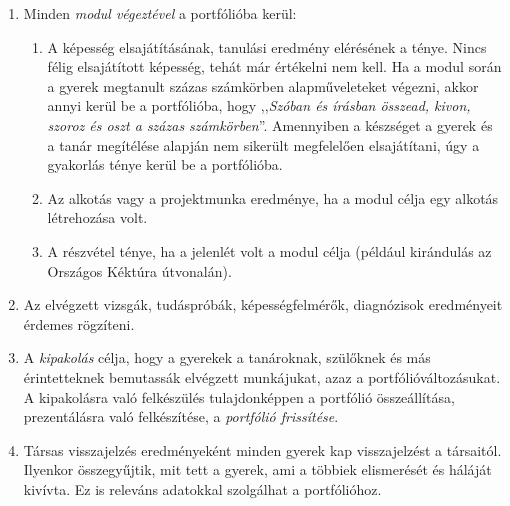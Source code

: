 \begin{enumerate}
      \item Minden \emph{modul végeztével} a portfólióba kerül:

            \begin{enumerate}

                  \item  A képesség elsajátításának, tanulási eredmény
                        elérésének a ténye.
                        Nincs
                        félig elsajátított képesség, tehát már értékelni nem
                        kell. Ha a modul során a gyerek megtanult százas
                        számkörben alapműveleteket
                        végezni, 
                        akkor
                        annyi kerül be a portfólióba, hogy ,,\emph{Szóban és
                              írásban
                              összead, kivon, szoroz és oszt a százas
                              számkörben}''. Amennyiben a
                        készséget a
                        gyerek és a
                        tanár megítélése alapján nem sikerült megfelelően
                        elsajátítani,
                        úgy a gyakorlás
                        ténye kerül be a portfólióba.
                  \item Az alkotás vagy a projektmunka eredménye, ha a modul
                        célja egy
                        alkotás
                        létrehozása volt.
                  \item A részvétel ténye, ha a jelenlét volt a modul célja
                        (például
                        kirándulás
                        az Országos Kéktúra útvonalán).

            \end{enumerate}
      \item Az elvégzett vizsgák, tudáspróbák, képességfelmérők, diagnózisok
            eredményeit érdemes rögzíteni.

      \item A \emph{kipakolás} célja, hogy a gyerekek a tanároknak, szülőknek
            és
            más érintetteknek bemutassák elvégzett
            munkájukat, azaz
            a portfólióváltozásukat. A kipakolásra való felkészülés
            tulajdonképpen
            a
            portfólió összeállítása, prezentálásra való felkészítése, a
            \emph{portfólió
                  frissítése}.

      \item Társas visszajelzés eredményeként minden gyerek kap visszajelzést a
            társaitól. Ilyenkor összegyűjtik, mit tett a gyerek, ami a többiek
            elismerését
            és háláját kivívta. Ez is releváns adatokkal szolgálhat a
            portfólióhoz.


\end{enumerate}
